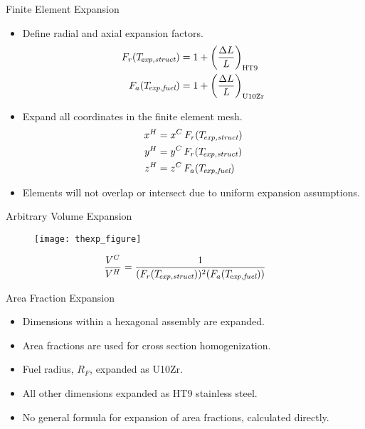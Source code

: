 \begin{frame}{Finite Element Expansion}
  \begin{itemize}
    \item Define radial and axial expansion factors.
      \begin{align}
        \label{eq:lef_r}
        F_r(T_{\!\mbox{\scriptsize \em exp,struct}}) &= 1 + \left(\frac{\Delta L}{L}\right)_{\text{HT9}} \\
        \label{eq:lef_a}
        F_a({T_{\!\mbox{\scriptsize \em exp,fuel}}}) &= 1 + \left(\frac{\Delta L}{L}\right)_{\text{U10Zr}}
      \end{align}
    \item Expand all coordinates in the finite element mesh.
      \begin{align}
        \label{eq:expand_x}
        x^H &= x^C \, F_r(T_{\!\mbox{\scriptsize \em exp,struct}}) \\
        \label{eq:expand_y}
        y^H &= y^C \, F_r(T_{\!\mbox{\scriptsize \em exp,struct}}) \\
        \label{eq:expand_z}
        z^H &= z^C \, F_a({T_{\!\mbox{\scriptsize \em exp,fuel}}})
      \end{align}
    \item Elements will not overlap or intersect due to uniform expansion
      assumptions.
  \end{itemize}
\end{frame}

\begin{frame}{Arbitrary Volume Expansion}
  \begin{figure}
    \centering
    \texttt{[image: thexp\_figure]}
    \label{fig:thexp_figure}
  \end{figure}
  \vspace{-0.5in}
  \begin{equation}
    \frac{V^C}{V^H} = \frac{1}{(F_r(T_{\!\mbox{\scriptsize \em exp,struct}}))^2 (F_a({T_{\!\mbox{\scriptsize \em exp,fuel}}}))}
  \end{equation}
\end{frame}

\begin{frame}{Area Fraction Expansion}
  \begin{itemize}
    \item Dimensions within a hexagonal assembly are expanded.
    \item Area fractions are used for cross section homogenization.
    \item Fuel radius, $R_F$, expanded as U10Zr.
    \item All other dimensions expanded as HT9 stainless steel.
    \item No general formula for expansion of area fractions, calculated
      directly.
  \end{itemize}
  \begin{figure}
    \centering
    \hspace{0.2in}
    \label{fig:assy_geometry}
  \end{figure}
\end{frame}

